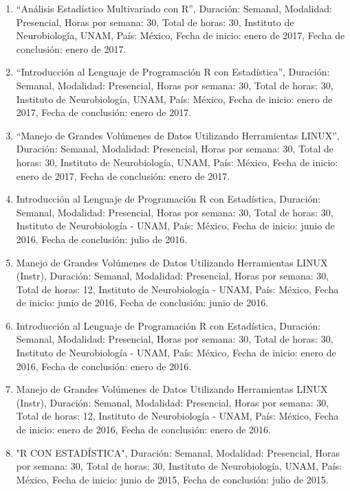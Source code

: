 \begin{enumerate}
\item “Análisis Estadístico Multivariado con R”, Duración: Semanal, Modalidad: Presencial, Horas por semana: 30, Total de 
horas: 
30, Instituto de Neurobiología, UNAM, País: México, Fecha de inicio: enero de 2017, Fecha de conclusión: enero de 2017.

\item “Introducción al Lenguaje de Programación R con Estadística”, Duración: Semanal, Modalidad: Presencial, Horas por 
semana: 
30, Total de horas: 30, Instituto de Neurobiología, UNAM, País: México, Fecha de inicio: enero de 2017, Fecha de conclusión: 
enero de 2017.

\item “Manejo de Grandes Volúmenes de Datos Utilizando Herramientas LINUX”, Duración: Semanal, Modalidad: Presencial, Horas 
por 
semana: 30, Total de horas: 30, Instituto de Neurobiología, UNAM, País: México, Fecha de inicio: enero de 2017, Fecha de 
conclusión: enero de 2017.

\item Introducción al Lenguaje de Programación R con Estadística, Duración: Semanal, Modalidad: Presencial, Horas por semana: 
30, Total de horas: 30, Instituto de Neurobiología - UNAM, País: México, Fecha de inicio: junio de 2016, Fecha de conclusión: 
julio de 2016.

\item Manejo de Grandes Volúmenes de Datos Utilizando Herramientas LINUX (Instr), Duración: Semanal, Modalidad: Presencial, 
Horas por semana: 30, Total de horas: 12, Instituto de Neurobiología - UNAM, País: México, Fecha de inicio: junio de 2016, 
Fecha de conclusión: junio de 2016.

\item Introducción al Lenguaje de Programación R con Estadística, Duración: Semanal, Modalidad: Presencial, Horas por semana: 
30, Total de horas: 30, Instituto de Neurobiología - UNAM, País: México, Fecha de inicio: enero de 2016, Fecha de conclusión: 
enero de 2016.

\item Manejo de Grandes Volúmenes de Datos Utilizando Herramientas LINUX (Instr), Duración: Semanal, Modalidad: Presencial, 
Horas por semana: 30, Total de horas: 12, Instituto de Neurobiología - UNAM, País: México, Fecha de inicio: enero de 2016, 
Fecha de conclusión: enero de 2016.

\item "R CON ESTADÍSTICA", Duración: Semanal, Modalidad: Presencial, Horas por semana: 30, Total de horas: 30, Instituto de 
Neurobiología, UNAM, País: México, Fecha de inicio: junio de 2015, Fecha de conclusión: julio de 2015.


\end{enumerate}
